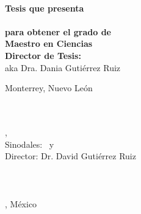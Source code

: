 \begin{titlepage}
	{\large \color{ctcolortitle}\textbf{\thesisTitle} \\[10mm]}
	{\large \textbf{Tesis que presenta}} \\[4mm]
	{\large \thesisName} \\[4mm]
	{\large \textbf{para obtener el grado de}} \\[4mm]
	{\large \textbf{Maestro en Ciencias}}\\[4mm]
	{\large \textbf{Director de Tesis:} \thesisFirstSupervisor\\ aka Dra. Dania Gutiérrez Ruiz} \\[10mm]
	\vfill
	\begin{flushleft}
		{\large Monterrey, Nuevo León}
		\hfill
		{\large \thesisDate}
	\end{flushleft}

\end{titlepage}


\hfill
\vfill
{
	\small
	\textbf{\thesisName} \\
	\textit{\thesisTitle} \\
	\thesisSubject, \thesisDate \\
	Sinodales: \thesisFirstReviewer\ y \thesisSecondReviewer \\
	Director: Dr. David Gutiérrez Ruiz\\[1.5em]
	\textbf{\thesisUniversity} \\
	\thesisUniversityDepartment \\
	\thesisUniversityStreetAddress \thesisUniversityPostalCode\\ 
	\thesisUniversityCity, México
}
